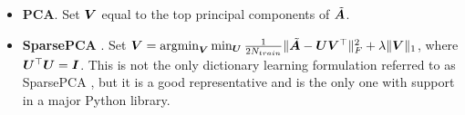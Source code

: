 \begin{itemize}\itemsep-1mm
    \item \textbf{PCA}. Set $\bm{V}$ equal to the top principal components of $\tilde{\bm{A}}$.
    \item \textbf{SparsePCA} \cite{sparsePCA}. Set $\bm{V} = \operatorname*{argmin}_{\bm{V}} \min_{\bm{U}} \frac{1}{2 N_{train}} \lVert \tilde{\bm{A}} - \bm{U}\bm{V}^\top \rVert^2_F + \lambda \lVert\bm{V}\rVert_1$, where $\bm{U}^\top \bm{U} = \bm{I}$. This is not the only dictionary learning formulation referred to as SparsePCA \cite{spcaSurvey1,spcaSurvey2}, but it is a good representative and is the only one with support in a major Python library.%



\end{itemize}
